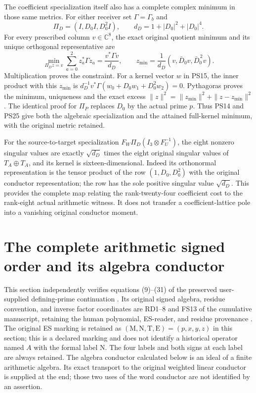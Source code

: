 \documentclass[11pt]{article}
\begin{document}
The coefficient specialization itself also has a complete complex
minimum in those same metrics. For either receiver set
$\Gamma=\Gamma_b$ and
\[
 \Pi_D=(I,D_0I,D_0^2I),\qquad
 d_D=1+|D_0|^2+|D_0|^4 .
\]
For every prescribed column $v\in\mathbb C^8$, the exact original
quotient minimum and its unique orthogonal representative are
\[
 \min_{\Pi_D z=v}\sum_{a=0}^2 z_a^*\Gamma z_a
       =\frac{v^*\Gamma v}{d_D},\qquad
 z_{\min}=\frac1{d_D}(v,\bar D_0v,\bar D_0^{\,2}v).
 \tag{PS25}
\]
Multiplication proves the constraint. For a kernel vector
$w$ in PS15, the inner product with this $z_{\min}$ is
$d_D^{-1}v^*\Gamma(w_0+D_0w_1+D_0^2w_2)=0$.
Pythagoras proves the minimum, uniqueness and the exact excess
$\|z\|^2=\|z_{\min}\|^2+\|z-z_{\min}\|^2$.
The identical proof for $\Pi_P$ replaces $D_0$ by the actual prime $p$.
Thus PS14 and PS25 give both the algebraic specialization and the
attained full-kernel minimum, with the original metric retained.

For the source-to-target specialization
$F_W\Pi_D(I_3\otimes F_U^{-1})$, the eight nonzero singular values
are exactly $\sqrt{d_D}$ times the eight original singular values
of $T_A\oplus T_A$, and its kernel is sixteen-dimensional.
Indeed its orthonormal representation is the tensor product of
the row $(1,D_0,D_0^2)$ with the original conductor representation;
the row has the sole positive singular value $\sqrt{d_D}$.
This provides the complete map relating the rank-twenty-four
coefficient cost to the rank-eight actual arithmetic witness.
It does not transfer a coefficient-lattice pole into a vanishing
original conductor moment.


\section{The complete arithmetic signed order and its algebra conductor}
This section independently verifies equations (9)--(31) of the preserved
user-supplied defining-prime continuation
\cite[eqs.\ (9)--(31)]{DefiningPrimeReceived}. Its original signed algebra,
residue convention, and inverse factor coordinates are RD1--8 and FS13
of the cumulative manuscript, retaining the human polynomial, ES-reader,
and residue provenance \cite{ES488,Tao,JouveRV}. The original ES marking is retained as
$(\mathrm M,\mathrm N,\mathrm T,\mathrm E)=(p,x,y,z)$ in this section;
this is a declared marking and does not identify a historical operator
named $A$ with the formal label $\mathrm N$. The four labels and both
signs at each label are always retained. The algebra conductor calculated
below is an ideal of a finite arithmetic algebra. Its exact transport to
the original weighted linear conductor is supplied at the end; those two
uses of the word conductor are not identified by an assertion.
\end{document}
